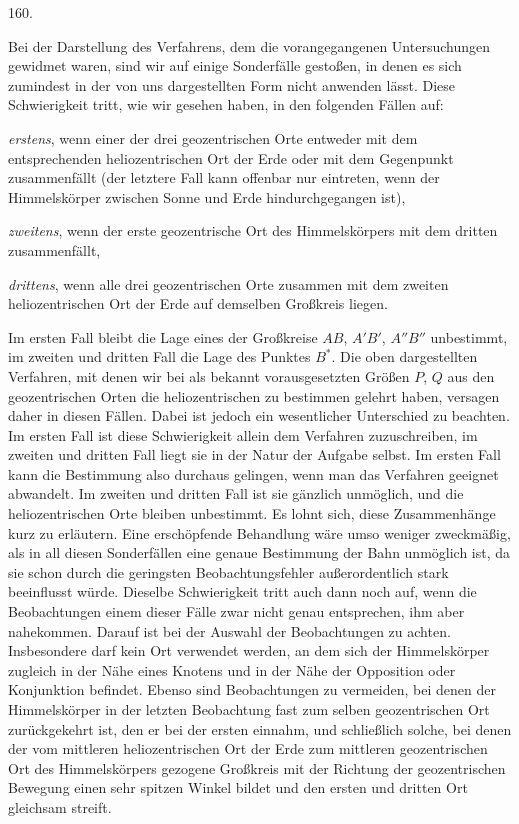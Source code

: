 \par{}\medskip
\begin{center}\hypertarget{native-222-article160}{}160.\end{center}
Bei der Darstellung des Verfahrens, dem die vorangegangenen Untersuchungen gewidmet waren, sind wir auf einige Sonderfälle gestoßen, in denen es sich zumindest in der von uns dargestellten Form nicht anwenden lässt. Diese Schwierigkeit tritt, wie wir gesehen haben, in den folgenden Fällen auf:

\noindent\emph{erstens}, wenn einer der drei geozentrischen Orte entweder mit dem entsprechenden heliozentrischen Ort der Erde oder mit dem Gegenpunkt zusammenfällt (der letztere Fall kann offenbar nur eintreten, wenn der Himmelskörper zwischen Sonne und Erde hindurchgegangen ist),

\noindent\emph{zweitens}, wenn der erste geozentrische Ort des Himmelskörpers mit dem dritten zusammenfällt,

\noindent\emph{drittens}, wenn alle drei geozentrischen Orte zusammen mit dem zweiten heliozentrischen Ort der Erde auf demselben Großkreis liegen.

Im ersten Fall bleibt die Lage eines der Großkreise $AB$, $A'B'$, $A''B''$ unbestimmt, im zweiten und dritten Fall die Lage des Punktes $B^*$. Die oben dargestellten Verfahren, mit denen wir bei als bekannt vorausgesetzten Größen $P$, $Q$ aus den geozentrischen Orten die heliozentrischen zu bestimmen gelehrt haben, versagen daher in diesen Fällen. Dabei ist jedoch ein wesentlicher Unterschied zu beachten. Im ersten Fall ist diese Schwierigkeit allein dem Verfahren zuzuschreiben, im zweiten und dritten Fall liegt sie in der Natur der Aufgabe selbst. Im ersten Fall kann die Bestimmung also durchaus gelingen, wenn man das Verfahren geeignet abwandelt. Im zweiten und dritten Fall ist sie gänzlich unmöglich, und die heliozentrischen Orte bleiben unbestimmt. Es lohnt sich, diese Zusammenhänge kurz zu erläutern. Eine erschöpfende Behandlung wäre umso weniger zweckmäßig, als in all diesen Sonderfällen eine genaue Bestimmung der Bahn unmöglich ist, da sie schon durch die geringsten Beobachtungsfehler außerordentlich stark beeinflusst würde. Dieselbe Schwierigkeit tritt auch dann noch auf, wenn die Beobachtungen einem dieser Fälle zwar nicht genau entsprechen, ihm aber nahekommen. Darauf ist bei der Auswahl der Beobachtungen zu achten. Insbesondere darf kein Ort verwendet werden, an dem sich der Himmelskörper zugleich in der Nähe eines Knotens und in der Nähe der Opposition oder Konjunktion befindet. Ebenso sind Beobachtungen zu vermeiden, bei denen der Himmelskörper in der letzten Beobachtung fast zum selben geozentrischen Ort zurückgekehrt ist, den er bei der ersten einnahm, und schließlich solche, bei denen der vom mittleren heliozentrischen Ort der Erde zum mittleren geozentrischen Ort des Himmelskörpers gezogene Großkreis mit der Richtung der geozentrischen Bewegung einen sehr spitzen Winkel bildet und den ersten und dritten Ort gleichsam streift.
